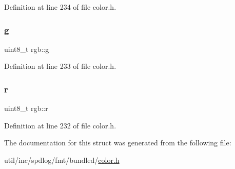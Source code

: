 Definition at line 234 of file color.\+h.

\mbox{\label{structrgb_a644713f43fbcf5e9f070fa1843aee55f}} 
\subsubsection{\texorpdfstring{g}{g}}
{\footnotesize\ttfamily uint8\+\_\+t rgb\+::g}



Definition at line 233 of file color.\+h.

\mbox{\label{structrgb_afd9a3feaf22de2f96ba25d19494235a6}} 
\subsubsection{\texorpdfstring{r}{r}}
{\footnotesize\ttfamily uint8\+\_\+t rgb\+::r}



Definition at line 232 of file color.\+h.



The documentation for this struct was generated from the following file\+:\begin{DoxyCompactItemize}
\item 
util/inc/spdlog/fmt/bundled/\hyperlink{color_8h}{color.\+h}\end{DoxyCompactItemize}
